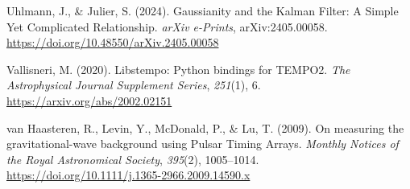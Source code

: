 \documentclass[
]{article}
\newlength{\cslhangindent}
\newenvironment{CSLReferences}[2] %
 {\begin{list}{}{%
  \setlength{\itemindent}{0pt}
  \setlength{\leftmargin}{0pt}
  \setlength{\parsep}{0pt}
  \ifodd #1
   \setlength{\leftmargin}{\cslhangindent}
   \setlength{\itemindent}{-1\cslhangindent}
  \fi
  \setlength{\itemsep}{#2\baselineskip}}}
 {\end{list}}
\begin{document}
\begin{CSLReferences}{1}{0}
Uhlmann, J., \& Julier, S. (2024). {Gaussianity and the Kalman Filter: A
Simple Yet Complicated Relationship}. \emph{arXiv e-Prints},
arXiv:2405.00058. \url{https://doi.org/10.48550/arXiv.2405.00058}

Vallisneri, M. (2020). Libstempo: Python bindings for TEMPO2. \emph{The
Astrophysical Journal Supplement Series}, \emph{251}(1), 6.
\url{https://arxiv.org/abs/2002.02151}

van Haasteren, R., Levin, Y., McDonald, P., \& Lu, T. (2009). {On
measuring the gravitational-wave background using Pulsar Timing Arrays}.
\emph{Monthly Notices of the Royal Astronomical Society}, \emph{395}(2),
1005--1014. \url{https://doi.org/10.1111/j.1365-2966.2009.14590.x}

\end{CSLReferences}
\end{document}
